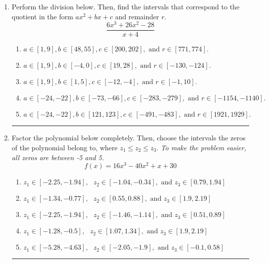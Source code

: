 \documentclass[14pt]{extbook}
\newcommand{\litem}[1]{\item#1\hspace*{-1cm}\rule{\textwidth}{0.4pt}}
\begin{document}
\begin{enumerate}
{\begin{enumerate}[label=\Alph*.]
\end{enumerate} }
\litem{
Perform the division below. Then, find the intervals that correspond to the quotient in the form $ax^2+bx+c$ and remainder $r$.\[ \frac{6x^{3} +26 x^{2} -28}{x + 4} \]\begin{enumerate}[label=\Alph*.]
\item \( a \in [1, 9], b \in [48, 55], c \in [200, 202], \text{ and } r \in [771, 774]. \)
\item \( a \in [1, 9], b \in [-4, 0], c \in [19, 28], \text{ and } r \in [-130, -124]. \)
\item \( a \in [1, 9], b \in [1, 5], c \in [-12, -4], \text{ and } r \in [-1, 10]. \)
\item \( a \in [-24, -22], b \in [-73, -66], c \in [-283, -279], \text{ and } r \in [-1154, -1140]. \)
\item \( a \in [-24, -22], b \in [121, 123], c \in [-491, -483], \text{ and } r \in [1921, 1929]. \)

\end{enumerate} }
\litem{
Factor the polynomial below completely. Then, choose the intervals the zeros of the polynomial belong to, where $z_1 \leq z_2 \leq z_3$. \textit{To make the problem easier, all zeros are between -5 and 5.}\[ f(x) = 16x^{3} -40 x^{2} +x + 30 \]\begin{enumerate}[label=\Alph*.]
\item \( z_1 \in [-2.25, -1.94], \text{   }  z_2 \in [-1.04, -0.34], \text{   and   } z_3 \in [0.79, 1.94] \)
\item \( z_1 \in [-1.34, -0.77], \text{   }  z_2 \in [0.55, 0.88], \text{   and   } z_3 \in [1.9, 2.19] \)
\item \( z_1 \in [-2.25, -1.94], \text{   }  z_2 \in [-1.46, -1.14], \text{   and   } z_3 \in [0.51, 0.89] \)
\item \( z_1 \in [-1.28, -0.5], \text{   }  z_2 \in [1.07, 1.34], \text{   and   } z_3 \in [1.9, 2.19] \)
\item \( z_1 \in [-5.28, -4.63], \text{   }  z_2 \in [-2.05, -1.9], \text{   and   } z_3 \in [-0.1, 0.58] \)


\end{enumerate}}
\end{enumerate}
\end{document}
